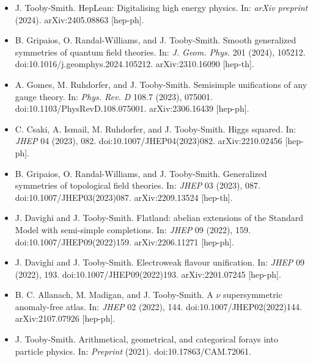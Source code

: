 \documentclass[14pt,letter]{article}
\newcommand{\mybullet}{\textcolor{mycolor}{$\ast$}\ }
\newcounter{customtitle}
\begin{document}
\vspace{0.3cm}
\begin{itemize}[label=\mybullet]
\item J. Tooby-Smith. {\color{mycolor} HepLean: Digitalising high energy physics}. In: \emph{arXiv preprint} (2024). arXiv:2405.08863 [hep-ph].

\item B. Gripaios, O. Randal-Williams, and J. Tooby-Smith. {\color{mycolor} Smooth generalized symmetries of quantum field theories}. In: \emph{J. Geom. Phys.} 201 (2024), 105212. doi:10.1016/j.geomphys.2024.105212. arXiv:2310.16090 [hep-th].

\item A. Gomes, M. Ruhdorfer, and J. Tooby-Smith. {\color{mycolor} Semisimple unifications of any gauge theory}. In: \emph{Phys. Rev. D} 108.7 (2023), 075001. doi:10.1103/PhysRevD.108.075001. arXiv:2306.16439 [hep-ph].

\item \sloppy C. Csaki, A. Ismail, M. Ruhdorfer, and J. Tooby-Smith. {\color{mycolor} Higgs squared}. In: \emph{JHEP} 04 (2023), 082. doi:10.1007/JHEP04(2023)082. arXiv:2210.02456 [hep-ph].

\item B. Gripaios, O. Randal-Williams, and J. Tooby-Smith. {\color{mycolor} Generalized symmetries of topological field theories}. In: \emph{JHEP} 03 (2023), 087. doi:10.1007/JHEP03(2023)087. arXiv:2209.13524 [hep-th].

\item J. Davighi and J. Tooby-Smith. {\color{mycolor} Flatland: abelian extensions of the Standard Model with semi-simple completions}. In: \emph{JHEP} 09 (2022), 159. doi:10.1007/JHEP09(2022)159. arXiv:2206.11271 [hep-ph].

\item J. Davighi and J. Tooby-Smith. {\color{mycolor} Electroweak flavour unification}. In: \emph{JHEP} 09 (2022), 193. doi:10.1007/JHEP09(2022)193. arXiv:2201.07245 [hep-ph].

\item B. C. Allanach, M. Madigan, and J. Tooby-Smith. {\color{mycolor} A \ensuremath{\nu} supersymmetric anomaly-free atlas}. In: \emph{JHEP} 02 (2022), 144. doi:10.1007/JHEP02(2022)144. arXiv:2107.07926 [hep-ph].

\item J. Tooby-Smith. {\color{mycolor} Arithmetical, geometrical, and categorical forays into particle physics}. In: \emph{Preprint} (2021). doi:10.17863/CAM.72061.


\end{itemize}
\end{document}
